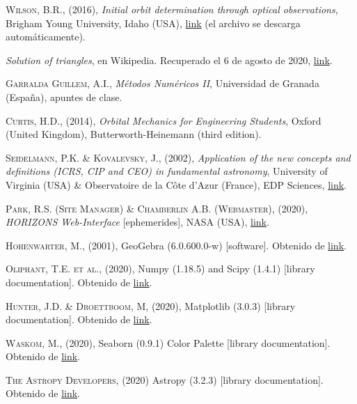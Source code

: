 \documentclass[11pt]{book}
\begin{document}
\begin{thebibliography}{99}
 \textsc{Wilson, B.R.}, (2016), \textit{Initial orbit determination through optical observations}, Brigham Young University, Idaho (USA), \href{https://www.byui.edu/documents/physics/Theses/Brett_WilsonS16.pdf}{link} (el archivo se descarga automáticamente).

 \textit{Solution of triangles}, en Wikipedia. Recuperado el 6 de agosto de 2020, \href{https://en.wikipedia.org/wiki/Solution_of_triangles#A_side_and_two_adjacent_angles_given_(ASA)}{link}.

 \textsc{Garralda Guillem, A.I.}, \textit{Métodos Numéricos II}, Universidad de Granada (España), apuntes de clase.

 \textsc{Curtis, H.D.}, (2014), \textit{Orbital Mechanics for Engineering Students}, Oxford (United Kingdom), Butterworth-Heinemann (third edition).

 \textsc{Seidelmann, P.K. \& Kovalevsky, J.}, (2002), \textit{Application of the new concepts and definitions (ICRS, CIP and CEO) in fundamental astronomy}, University of Virginia (USA) \& Observatoire de la Côte d'Azur (France), EDP Sciences, \href{https://www.aanda.org/articles/aa/full/2002/34/aa2452/aa2452.html}{link}.

 \textsc{Park, R.S. (Site Manager) \& Chamberlin A.B. (Webmaster)}, (2020), \textit{HORIZONS Web-Interface} [ephemerides], NASA (USA), \href{https://ssd.jpl.nasa.gov/horizons.cgi}{link}.

 \textsc{Hohenwarter, M.}, (2001), GeoGebra (6.0.600.0-w) [software]. Obtenido de \href{https://www.geogebra.org/classic}{link}.

 \textsc{Oliphant, T.E. et al.}, (2020), Numpy (1.18.5) and Scipy (1.4.1) [library documentation]. Obtenido de \href{https://docs.scipy.org/doc/}{link}.

 \textsc{Hunter, J.D. \& Droettboom, M}, (2020), Matplotlib (3.0.3) [library documentation]. Obtenido de \href{https://matplotlib.org/3.0.3/index.html}{link}.

 \textsc{Waskom, M.}, (2020), Seaborn (0.9.1) Color Palette [library documentation]. Obtenido de \href{https://seaborn.pydata.org/tutorial/color_palettes.html}{link}.

 \textsc{The Astropy Developers}, (2020) Astropy (3.2.3) [library documentation]. Obtenido de \href{https://docs.astropy.org/en/stable/index.html}{link}.


\end{thebibliography}
\end{document}
